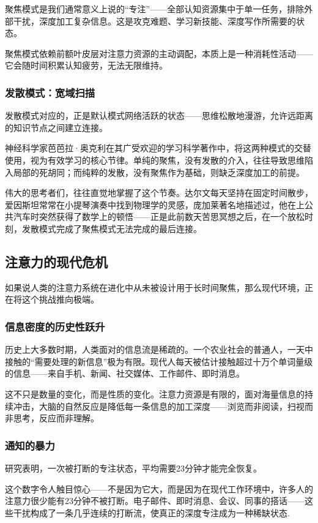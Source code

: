 \documentclass[11pt]{article}
\begin{document}
聚焦模式是我们通常意义上说的“专注”——全部认知资源集中于单一任务，排除外部干扰，深度加工复杂信息。这是攻克难题、学习新技能、深度写作所需要的状态。

聚焦模式依赖前额叶皮层对注意力资源的主动调配，本质上是一种消耗性活动——它会随时间积累认知疲劳，无法无限维持。
\subsubsection{发散模式：宽域扫描}
\label{sec:orgb9be856}

发散模式对应的，正是默认模式网络活跃的状态——思维松散地漫游，允许远距离的知识节点之间建立连接。

神经科学家芭芭拉·奥克利在其广受欢迎的学习科学著作中，将这两种模式的交替使用，视为有效学习的核心节律。单纯的聚焦，没有发散的介入，往往导致思维陷入局部的死胡同；而纯粹的发散，没有聚焦作为基础，则缺乏深度加工的前提。

伟大的思考者们，往往直觉地掌握了这个节奏。达尔文每天坚持在固定时间散步，爱因斯坦常常在小提琴演奏中找到物理学的灵感，庞加莱著名地描述过，他在上公共汽车时突然获得了数学上的顿悟——正是此前数天苦思冥想之后，在一个放松时刻，发散模式完成了聚焦模式无法完成的最后连接。
\subsection{注意力的现代危机}
\label{sec:org6dc86d1}

如果说人类的注意力系统在进化中从未被设计用于长时间聚焦，那么现代环境，正在将这个挑战推向极端。
\subsubsection{信息密度的历史性跃升}
\label{sec:orgfec8551}

历史上大多数时期，人类面对的信息流是稀疏的。一个农业社会的普通人，一天中接触的“需要处理的新信息”极为有限。现代人每天被估计接触超过十万个单词量级的信息——来自手机、新闻、社交媒体、工作邮件、即时消息。

这不只是数量的变化，而是性质的变化。注意力资源是有限的，面对海量信息的持续冲击，大脑的自然反应是降低每一条信息的加工深度——浏览而非阅读，扫视而非思考，反应而非理解。
\subsubsection{通知的暴力}
\label{sec:org4657bb4}

研究表明，一次被打断的专注状态，平均需要23分钟才能完全恢复。

这个数字令人触目惊心——不是因为它大，而是因为在现代工作环境中，许多人的注意力很少能有23分钟不被打断。电子邮件、即时消息、会议、同事的搭话——这些干扰构成了一条几乎连续的打断流，使真正的深度专注成为一种稀缺状态.
\end{document}
